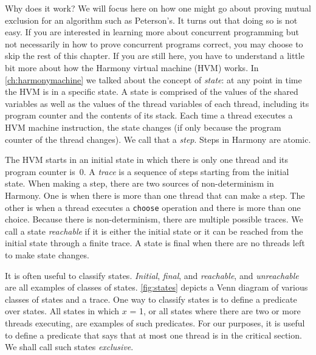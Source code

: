\documentclass{report}
\begin{document}
Why does it work?  We will focus here on how one might go about proving
mutual exclusion for an algorithm such as Peterson's.
It turns out that doing so is not easy.
If you are interested in learning more about concurrent programming
but not necessarily in how to prove concurrent programs correct, you
may choose to skip the rest of this chapter.
If you are still here, you have to understand a little bit more about
how the Harmony virtual machine (HVM) works.
In \autoref{ch:harmonymachine} we talked about the concept of \emph{state}:
%
at any point in time the HVM is in a specific state.
A state is comprised of the values of the shared variables as well as
the values of the thread variables
%
of each thread, including its
program counter and the contents of its stack.
Each time a thread executes a HVM machine instruction, the
state changes (if only because the program counter of the thread
changes).  We call that a \emph{step}.
%
Steps in Harmony are atomic.

%
%

The HVM starts in an initial state in which there is only
one thread and its program counter is~0.  A \emph{trace}
%
is a sequence of steps starting from the initial state.
When making a step, there are two sources of non-determinism
%
in Harmony.
One is when
there is more than one thread that can make a step.  The other is
when a thread executes a \texttt{choose} operation and there is
more than one choice.
Because there is non-determinism, there are multiple possible traces.
We call a state \emph{reachable}
%
if it is either the initial state
or it can be reached from the initial state through a finite trace.
A state is final
when there are no threads left to make state changes.

It is often useful to classify states.
\emph{Initial}, \emph{final}, and \emph{reachable}, and \emph{unreachable}
are all examples of classes of states.
\autoref{fig:states} depicts a Venn diagram of various classes of states
and a trace.
One way to classify states is to define a predicate over states.
All states in which $x$ = 1, or all states where
there are two or more threads executing, are examples of such predicates.
For our purposes, it is useful to define a predicate that says that at
most one thread is in the critical section.  We shall call such states
\emph{exclusive}.
\end{document}
